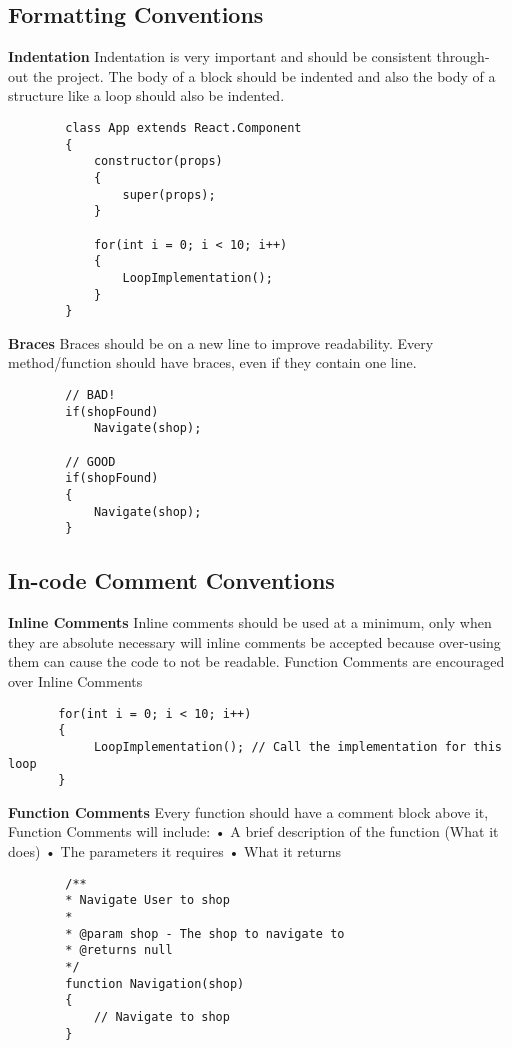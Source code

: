 \documentclass{article}
\begin{document}
\subsection{Formatting Conventions}
    \indent \textbf{Indentation}
    Indentation is very important and should be consistent through-  \indent out the project. The body of a block should be indented and also the body \indent of a structure like a loop should also be indented. \newline
    \begin{lstlisting}
        class App extends React.Component
        {
            constructor(props)
            {
                super(props);
            }
            
            for(int i = 0; i < 10; i++)
            {
                LoopImplementation();
            }
        }
    \end{lstlisting}
    \newline 
    \indent \textbf{Braces}
    Braces should be on a new line to improve readability. Every method/function should have braces, even if they contain one line.
    \begin{lstlisting}
        // BAD!
        if(shopFound)
            Navigate(shop);
        
        // GOOD  
        if(shopFound)
        {
            Navigate(shop);
        }
    \end{lstlisting}
    

\subsection{In-code Comment Conventions}
    \indent \textbf{Inline Comments}
    Inline comments should be used at a minimum, only \indent when they are absolute necessary will inline comments be accepted because \indent over-using them can cause the code to not be readable. Function Comments \indent are encouraged over Inline Comments
    \begin{lstlisting}
       for(int i = 0; i < 10; i++)
       {
            LoopImplementation(); // Call the implementation for this loop
       }
    \end{lstlisting}
    
    
    \indent \textbf{Function Comments}
    Every function should have a comment block above \indent it, Function Comments will include:\newline
 \indent \indent•	A brief description of the function (What it does)\newline
 \indent \indent•	The parameters it requires\newline
 \indent \indent•	What it returns\newline
    \begin{lstlisting}
        /**
        * Navigate User to shop
        * 
        * @param shop - The shop to navigate to
        * @returns null
        */
        function Navigation(shop)
        {
            // Navigate to shop
        }
    \end{lstlisting}
\end{document}
